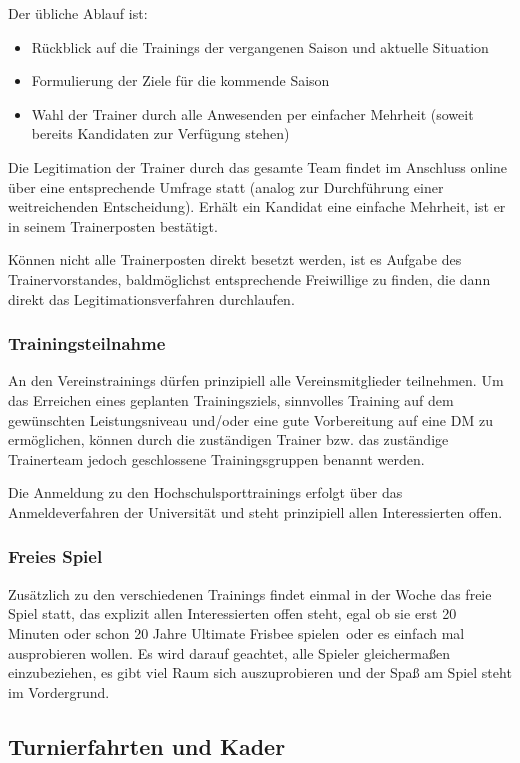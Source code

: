 \documentclass[a4 paper, 11pt]{article}
\begin{document}
Der übliche Ablauf ist:
\begin{itemize}
	\item Rückblick auf die Trainings der vergangenen Saison und aktuelle Situation
	\item Formulierung der Ziele für die kommende Saison
	\item Wahl der Trainer durch alle Anwesenden per einfacher Mehrheit (soweit bereits Kandidaten zur Verfügung stehen)
\end{itemize}

Die Legitimation der Trainer durch das gesamte Team findet im Anschluss online über eine entsprechende Umfrage statt (analog zur Durchführung einer weitreichenden Entscheidung). Erhält ein Kandidat eine einfache Mehrheit, ist er in seinem Trainerposten bestätigt.

Können nicht alle Trainerposten direkt besetzt werden, ist es Aufgabe des Trainervorstandes, baldmöglichst entsprechende Freiwillige zu finden, die dann direkt das Legitimationsverfahren durchlaufen.

\subsubsection{Trainingsteilnahme}
An den Vereinstrainings dürfen prinzipiell alle Vereinsmitglieder teilnehmen. Um das Erreichen eines geplanten Trainingsziels, sinnvolles Training auf dem gewünschten Leistungsniveau und/oder eine gute Vorbereitung auf eine DM zu ermöglichen, können durch die zuständigen Trainer bzw. das zuständige Trainerteam jedoch geschlossene Trainingsgruppen benannt werden.

Die Anmeldung zu den Hochschulsporttrainings erfolgt über das Anmeldeverfahren der Universität und steht prinzipiell allen Interessierten offen.

\subsubsection{Freies Spiel}
Zusätzlich zu den verschiedenen Trainings findet einmal in der Woche das freie Spiel statt, das explizit allen Interessierten offen steht, egal \glqq ob sie erst 20 Minuten oder schon 20 Jahre Ultimate Frisbee spielen\grqq\ oder es einfach mal ausprobieren wollen. Es wird darauf geachtet, alle Spieler gleichermaßen einzubeziehen, es gibt viel Raum sich auszuprobieren und der Spaß am Spiel steht im Vordergrund.

\subsection{Turnierfahrten und Kader}
\end{document}
